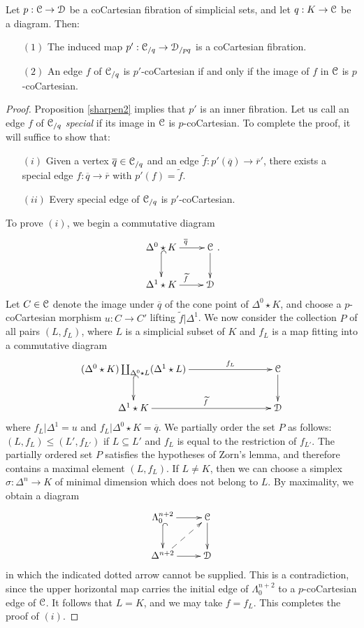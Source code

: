 \begin{proposition}\label{verylonger}
Let $p: \operatorname{\mathcal{C}} \rightarrow \operatorname{\mathcal{D}}$ be a coCartesian fibration of simplicial sets, and let
$q: K \rightarrow \operatorname{\mathcal{C}}$ be a diagram. Then:
\begin{itemize}
\item[$(1)$] The induced map $p': \operatorname{\mathcal{C}}_{/q} \rightarrow \operatorname{\mathcal{D}}_{/pq}$ is a coCartesian fibration.
\item[$(2)$] An edge $f$ of $\operatorname{\mathcal{C}}_{/q}$ is $p'$-coCartesian if and only if the image
of $f$ in $\operatorname{\mathcal{C}}$ is $p$-coCartesian.
\end{itemize}
\end{proposition}

\begin{proof}
Proposition \ref{sharpen2} implies that $p'$ is an inner fibration. Let us call an edge
$f$ of $\operatorname{\mathcal{C}}_{/q}$ {\it special} if its image in $\operatorname{\mathcal{C}}$ is $p$-coCartesian. To complete the proof, it will suffice to show that:
\begin{itemize}
\item[$(i)$] Given a vertex $\overline{q} \in \operatorname{\mathcal{C}}_{/q}$ and an edge
$\widetilde{f}: p'( \overline{q} ) \rightarrow \overline{r}'$, there exists a special edge
$f: \overline{q} \rightarrow \overline{r}$ with $p'(f) = \widetilde{f}$. 
\item[$(ii)$] Every special edge of $\operatorname{\mathcal{C}}_{/q}$ is $p'$-coCartesian.
\end{itemize}

To prove $(i)$, we begin a commutative diagram
$$ \xymatrix{ \Delta^0 \star K \ar[r]^{\overline{q}} \ar@{^{(}->}[d] & \calC \ar[d] \\
\Delta^1 \star K \ar[r]^{\widetilde{f}} & \calD }. $$
Let $C \in \operatorname{\mathcal{C}}$ denote the image under $\overline{q}$ of the cone point of
$\Delta^0 \star K$, and choose a $p$-coCartesian morphism
$u: C \rightarrow C'$ lifting $\widetilde{f}| \Delta^1$. We now consider the
collection $P$ of all pairs $(L, f_L)$, where $L$ is a simplicial subset of $K$ and $f_L$ is a map fitting into a commutative diagram
$$ \xymatrix{ (\Delta^0 \star K) \coprod_{ \Delta^0 \star L} (\Delta^1 \star L) \ar[rrr]^-{f_L} \ar@{^{(}->}[d] & & & \calC \ar[d] \\
\Delta^1 \star K \ar[rrr]^{\widetilde{f}} & &  & \calD } $$
where $f_L | \Delta^1 = u$ and $f_L | \Delta^0 \star K = \overline{q}$. We partially order
the set $P$ as follows: $(L, f_L) \leq (L', f_{L'})$ if $L \subseteq L'$ and $f_{L}$ is equal
to the restriction of $f_{L'}$. The partially ordered set $P$ satisfies the hypotheses of Zorn's lemma, and therefore contains a maximal element $(L,f_L)$. If $L \neq K$, then we can choose a simplex
$\sigma: \Delta^n \rightarrow K$ of minimal dimension which does not belong to $L$. By maximality, we obtain a diagram
$$ \xymatrix{ \Lambda^{n+2}_{0} \ar[r] \ar@{^{(}->}[d] & \calC \ar[d] \\
\Delta^{n+2} \ar[r] \ar@{-->}[ur] & \calD }$$
in which the indicated dotted arrow cannot be supplied. This is a contradiction, since
the upper horizontal map carries the initial edge of $\Lambda^{n+2}_0$ to a $p$-coCartesian
edge of $\operatorname{\mathcal{C}}$. It follows that $L = K$, and we may take $f = f_L$. This completes the proof of $(i)$.


\end{proof}
